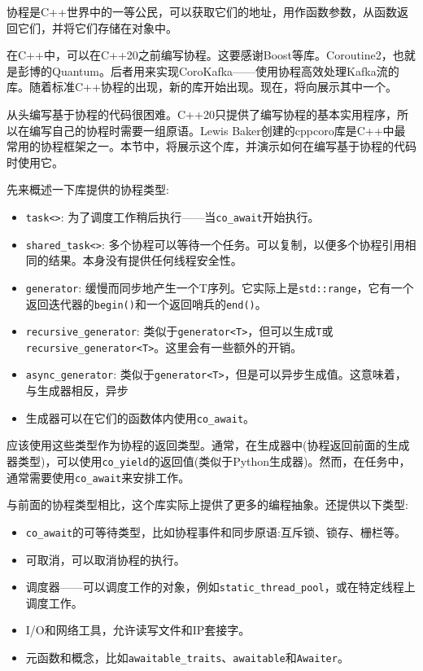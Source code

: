 协程是C++世界中的一等公民，可以获取它们的地址，用作函数参数，从函数返回它们，并将它们存储在对象中。

在C++中，可以在C++20之前编写协程。这要感谢Boost等库。Coroutine2，也就是彭博的Quantum。后者用来实现CoroKafka——使用协程高效处理Kafka流的库。随着标准C++协程的出现，新的库开始出现。现在，将向展示其中一个。


从头编写基于协程的代码很困难。C++20只提供了编写协程的基本实用程序，所以在编写自己的协程时需要一组原语。Lewis Baker创建的cppcoro库是C++中最常用的协程框架之一。本节中，将展示这个库，并演示如何在编写基于协程的代码时使用它。

先来概述一下库提供的协程类型:

\begin{itemize}
\item 
\texttt{task<>}: 为了调度工作稍后执行——当\texttt{co\_await}开始执行。

\item 
\texttt{shared\_task<>}: 多个协程可以等待一个任务。可以复制，以便多个协程引用相同的结果。本身没有提供任何线程安全性。

\item 
\texttt{generator}: 缓慢而同步地产生一个T序列。它实际上是\texttt{std::range}，它有一个返回迭代器的\texttt{begin()}和一个返回哨兵的\texttt{end()}。

\item 
\texttt{recursive\_generator}: 类似于\texttt{generator<T>}，但可以生成\texttt{T}或\texttt{recursive\_generator<T>}。这里会有一些额外的开销。

\item 
\texttt{async\_generator}: 类似于\texttt{generator<T>}，但是可以异步生成值。这意味着，与生成器相反，异步

\item 
生成器可以在它们的函数体内使用\texttt{co\_await}。
\end{itemize}

应该使用这些类型作为协程的返回类型。通常，在生成器中(协程返回前面的生成器类型)，可以使用\texttt{co\_yield}的返回值(类似于Python生成器)。然而，在任务中，通常需要使用\texttt{co\_await}来安排工作。

与前面的协程类型相比，这个库实际上提供了更多的编程抽象。还提供以下类型:

\begin{itemize}
\item 
\texttt{co\_await}的可等待类型，比如协程事件和同步原语:互斥锁、锁存、栅栏等。

\item 
可取消，可以取消协程的执行。

\item 
调度器——可以调度工作的对象，例如\texttt{static\_thread\_pool}，或在特定线程上调度工作。

\item 
I/O和网络工具，允许读写文件和IP套接字。

\item 
元函数和概念，比如\texttt{awaitable\_traits}、\texttt{awaitable}和\texttt{Awaiter}。
\end{itemize}

